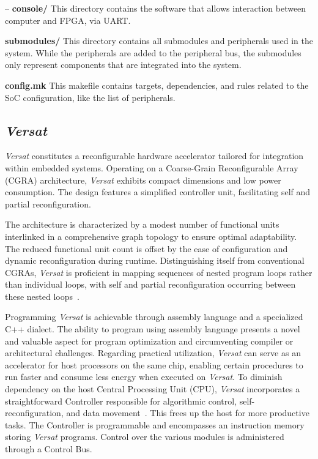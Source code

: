 \hspace{0.5cm}– \textbf{console/} This directory contains the software that allows interaction between computer and FPGA, via UART.

\textbf{submodules/} This directory contains all submodules and peripherals used in the system. While the peripherals are added to the peripheral bus, the submodules only represent components that are integrated into the system. 

\textbf{config.mk} This makefile contains targets, dependencies, and rules related to the SoC configuration, like the list of peripherals.


\subsection{\textit{Versat}}

\textit{Versat} constitutes a reconfigurable hardware accelerator tailored for integration within embedded systems. Operating on a Coarse-Grain Reconfigurable Array (CGRA) architecture, \textit{Versat} exhibits compact dimensions and low power consumption. The design features a simplified controller unit, facilitating self and partial reconfiguration.

The architecture is characterized by a modest number of functional units interlinked in a comprehensive graph topology to ensure optimal adaptability. The reduced functional unit count is offset by the ease of configuration and dynamic reconfiguration during runtime. Distinguishing itself from conventional CGRAs, \textit{Versat} is proficient in mapping sequences of nested program loops rather than individual loops, with self and partial reconfiguration occurring between these nested loops~\cite{tese2019}.

Programming \textit{Versat} is achievable through assembly language and a specialized C++ dialect. The ability to program using assembly language presents a novel and valuable aspect for program optimization and circumventing compiler or architectural challenges.
Regarding practical utilization, \textit{Versat} can serve as an accelerator for host processors on the same chip, enabling certain procedures to run faster and consume less energy when executed on \textit{Versat}. To diminish dependency on the host Central Processing Unit (CPU), \textit{Versat} incorporates a straightforward Controller responsible for algorithmic control, self-reconfiguration, and data movement~\cite{tese2017}. This frees up the host for more productive tasks. The Controller is programmable and encompasses an instruction memory storing \textit{Versat} programs. Control over the various modules is administered through a Control Bus.

